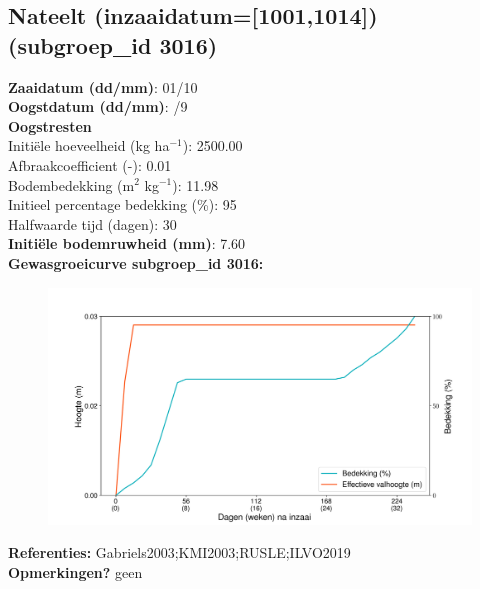 \documentclass{article}
\begin{document}
 \subsection{Nateelt (inzaaidatum=[1001,1014]) (subgroep\_id 3016)} 
  \textbf{Zaaidatum (dd/mm)}: 01/10  \vspace{0.10cm} \\ 
  \textbf{Oogstdatum (dd/mm)}: /9  \vspace{0.10cm} \\ 
  \textbf{Oogstresten} \vspace{0.05cm} \\ 
  \tab Initi\"{e}le hoeveelheid (kg ha$^{-1}$): 2500.00 \vspace{0.05cm} \\ 
  \tab Afbraakcoefficient (-): 0.01 \vspace{0.05cm} \\ 
  \tab Bodembedekking (m$^2$ kg$^{-1}$): 11.98 \vspace{0.05cm} \\ 
  \tab Initieel percentage bedekking (\%): 95 \vspace{0.05cm} \\ 
  \tab Halfwaarde tijd (dagen): 30 \vspace{0.05cm} \\ 
  \textbf{Initi\"{e}le bodemruwheid (mm)}: 7.60 \vspace{0.05cm} \\ 
  \textbf{Gewasgroeicurve subgroep\_id 3016:} 
 \begin{center} \begin{figure}[H] \includegraphics[width=12.5cm]{temp/3016.png} \end{figure} \end{center} 
  \textbf{Referenties:} Gabriels2003;KMI2003;RUSLE;ILVO2019 \vspace{0.10cm} \\ 
  \textbf{Opmerkingen?} geen \vspace{0.10cm} \\ 
 \newpage 
\end{document}
